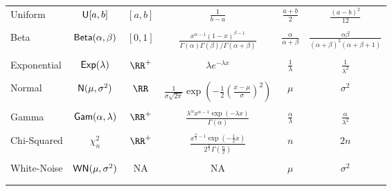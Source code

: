 \begin{longtable}{lccccc}
    Uniform           & ${\sf U} [a,b]$             & $[a,b]$                        & $\frac{1}{b-a}$                                                                                          & $\frac{a+b}{2}$          & $\frac{(a-b)^2}{12}$       \\\\
    Beta              & ${\sf Beta} (\alpha , \beta)$ & $[0,1]$                        & $\frac{x^{\alpha - 1} {(1-x)}^{\beta - 1}}{\Gamma (\alpha) \Gamma (\beta) / \Gamma (\alpha + \beta)}$    & $\frac{\alpha}{\alpha + \beta}$          & $\frac{\alpha \beta}{(\alpha + \beta)^2 (\alpha + \beta + 1)}$       \\\\
    Exponential       & ${\sf Exp} (\lambda)$         & $\RR^{+}$                      & $\lambda e^{-\lambda x}$                                                                                 & $\frac{1}{\lambda}$      & $\frac{1}{\lambda^2}$        \\\\
    Normal            & ${\sf N} (\mu, \sigma^2)$   & $\RR$                          & $\frac{1}{\sigma \sqrt{2 \pi}} \exp \left( -\frac{1}{2} \left( \frac{x - \mu}{\sigma} \right)^2 \right)$ & $\mu$                    & $\sigma^2$                 \\\\
    Gamma             & ${\sf Gam} (\alpha, \lambda)$ & $\RR^{+}$                      & $\frac{\lambda^{\alpha} x^{\alpha - 1} \exp (-\lambda x)}{\Gamma (\alpha)}$                              & $\frac{\alpha}{\lambda}$ & $\frac{\alpha}{\lambda^2}$ \\\\
    Chi-Squared       & $\chi^2_{n}$             & $\RR^{+}$                      & $\frac{x^{\frac{n}{2} - 1} \exp (-\frac{1}{2} x)}{2^{\frac{n}{2}} \Gamma (\frac{n}{2})}$                 & $n$                      & $2n$                       \\\\
    White-Noise       & ${\sf WN} (\mu , \sigma^2)$   & NA                             & NA                                                                                                       & $\mu$                    & $\sigma^2$                 \\\\

    \\\bottomrule
    \hline
\end{longtable}